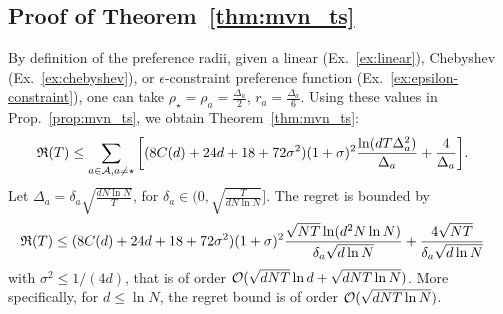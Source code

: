 \subsection{Proof of Theorem~\ref{thm:mvn_ts}}

By definition of the preference radii, given a linear (Ex.~\ref{ex:linear}), Chebyshev (Ex.~\ref{ex:chebyshev}), or $\epsilon$-constraint preference function (Ex.~\ref{ex:epsilon-constraint}), one can take $\rho_\star = \rho_a = \frac{\Delta_a}{2}$, $r_a = \frac{\Delta_a}{6}$. Using these values in Prop.~\ref{prop:mvn_ts}, we obtain Theorem~\ref{thm:mvn_ts}:
\begin{align*}
    \mathfrak{R}(T)
    & \leq \sum_{a \in \mathcal{A}, a \neq \star} \bigg[
    (8C(d) + 24d + 18 + 72\sigma^2) (1 + \sigma)^2 \frac{\ln(d T \Delta_a^2)}{\Delta_a} + \frac{4}{\Delta_a} \bigg].
\end{align*}
Let $\Delta_a = \delta_a \sqrt{\frac{dN \ln N}{T}}$, for $\delta_a \in (0, \sqrt{\frac{T}{d N \ln N}}]$. The regret is bounded by
\begin{align*}
    \mathfrak{R}(T)
    & \leq (8C(d) + 24d + 18 + 72 \sigma^2) (1 + \sigma)^2  \frac{\sqrt{N T} \ln(d^2 N \ln N)}{\delta_a \sqrt{d \ln N}} + \frac{4 \sqrt{N T}}{\delta_a \sqrt{d \ln N}}
\end{align*}
with $\sigma^2 \leq 1/(4d)$, that is of order $\mathcal{O}(\sqrt{dNT}\ln d + \sqrt{dNT \ln N})$. More specifically, for $d \leq \ln N$, the regret bound is of order $\mathcal{O}(\sqrt{dNT \ln N})$.
